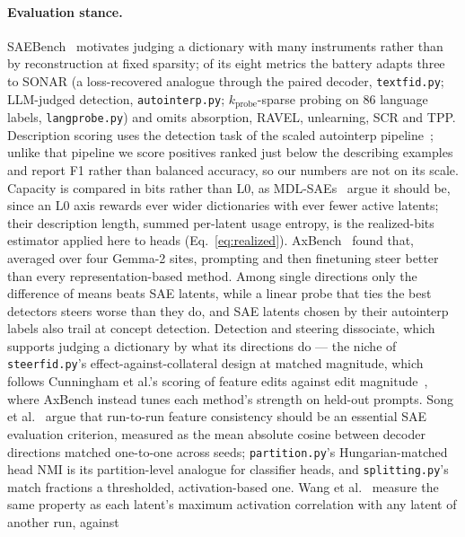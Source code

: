 \documentclass[11pt]{article}
\begin{document}
\paragraph{Evaluation stance.}
SAEBench~\cite{karvonen2025} motivates judging a dictionary with many
instruments rather than by reconstruction at fixed sparsity; of its eight
metrics the battery adapts three to SONAR (a loss-recovered analogue
through the paired decoder, \texttt{textfid.py}; LLM-judged detection,
\texttt{autointerp.py}; $k_{\mathrm{probe}}$-sparse probing on 86
language labels, \texttt{langprobe.py}) and omits absorption, RAVEL,
unlearning, SCR and TPP. Description scoring uses the detection task of
the scaled autointerp pipeline~\cite{paulo2025}; unlike that pipeline we
score positives ranked just below the describing examples and report F1
rather than balanced accuracy, so our numbers are not on its scale.
Capacity is compared in bits rather than $\mathrm{L0}$, as
MDL-SAEs~\cite{ayonrinde2024} argue it should be, since an $\mathrm{L0}$
axis rewards ever wider dictionaries with ever fewer active latents; their
description length, summed per-latent usage entropy, is the realized-bits
estimator applied here to heads (Eq.~\eqref{eq:realized}).
AxBench~\cite{wu2025axbenchsteeringllmssimple} found that, averaged over
four Gemma-2 sites, prompting and then finetuning steer better than every
representation-based method. Among single directions only the difference
of means beats SAE latents, while a linear probe that ties the best
detectors steers worse than they do, and SAE latents chosen by their
autointerp labels also trail at concept detection. Detection and steering
dissociate, which supports judging a dictionary by what its directions do
--- the niche of \texttt{steerfid.py}'s
effect-against-collateral design at matched magnitude, which follows
Cunningham et al.'s scoring of feature edits against edit
magnitude~\cite{cunningham2023}, where AxBench instead tunes each method's
strength on held-out prompts. Song et
al.~\cite{song2025positionmechanisticinterpretabilityprioritize} argue
that run-to-run feature consistency should be an essential SAE evaluation
criterion, measured as the mean absolute cosine between decoder directions
matched one-to-one across seeds; \texttt{partition.py}'s Hungarian-matched
head NMI is its partition-level analogue for classifier heads, and
\texttt{splitting.py}'s match fractions a thresholded, activation-based
one. Wang et al.~\cite{wang2024} measure the same property as each latent's
maximum activation correlation with any latent of another run, against
\end{document}
